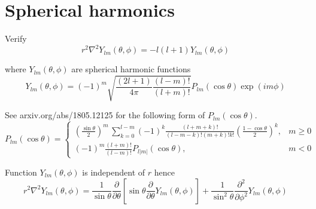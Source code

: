 

\section*{Spherical harmonics}

Verify
\begin{equation*}
r^2\nabla^2Y_{lm}(\theta,\phi)=-l(l+1)Y_{lm}(\theta,\phi)
\end{equation*}

where $Y_{lm}(\theta,\phi)$ are spherical harmonic functions
\begin{equation*}
Y_{lm}(\theta,\phi)=(-1)^m\sqrt{\frac{(2l+1)}{4\pi}\frac{(l-m)!}{(l+m)!}}
P_{lm}(\cos\theta)\exp(im\phi)
\end{equation*}

See arxiv.org/abs/1805.12125 for the following form of $P_{lm}(\cos\theta)$.
\begin{equation*}
P_{lm}(\cos\theta)=\begin{cases}\displaystyle
\left(\frac{\sin\theta}{2}\right)^m\,\sum_{k=0}^{l-m}
(-1)^k\frac{(l+m+k)!}{(l-m-k)!(m+k)!k!}
\left(\frac{1-\cos\theta}{2}\right)^k, & m\ge0
\\[4ex]
\displaystyle(-1)^m\frac{(l+m)!}{(l-m)!}P_{l|m|}(\cos\theta), & m<0
\end{cases}
\end{equation*}

Function $Y_{lm}(\theta,\phi)$ is independent of $r$ hence
\begin{equation*}
r^2\nabla^2Y_{lm}(\theta,\phi)=\frac{1}{\sin\theta}\frac{\partial}{\partial\theta}
\left[\sin\theta\frac{\partial}{\partial\theta}Y_{lm}(\theta,\phi)\right]
+\frac{1}{\sin^2\theta}\frac{\partial^2}{\partial\phi^2}Y_{lm}(\theta,\phi)
\end{equation*}


